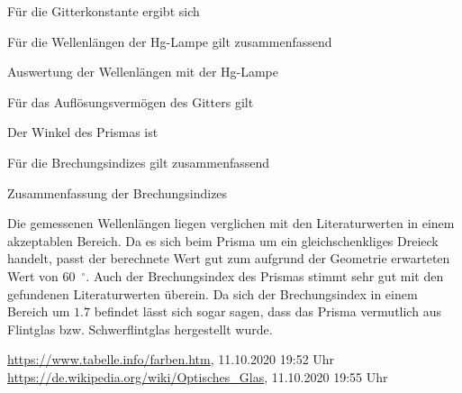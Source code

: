 \documentclass{article}
\begin{document}
Für die Gitterkonstante ergibt sich


Für die Wellenlängen der Hg-Lampe gilt zusammenfassend
\begin{table}[H]
\caption{Auswertung der Wellenlängen mit der Hg-Lampe}
\centering

\end{table}

Für das Auflösungsvermögen des Gitters gilt


Der Winkel des Prismas ist



Für die Brechungsindizes gilt zusammenfassend
\begin{table}[H]
\caption{Zusammenfassung der Brechungsindizes}
\centering

\end{table}




Die gemessenen Wellenlängen liegen verglichen mit den Literaturwerten \cite{other} in einem akzeptablen Bereich.
Da es sich beim Prisma um ein gleichschenkliges Dreieck handelt, passt der berechnete Wert gut zum aufgrund der Geometrie erwarteten Wert von 60~${}^\circ$.
Auch der Brechungsindex des Prismas stimmt sehr gut mit den gefundenen Literaturwerten \cite{wiki} überein. Da sich der Brechungsindex in einem Bereich um $1.7$ befindet lässt sich sogar sagen, dass das Prisma vermutlich aus Flintglas bzw. Schwerflintglas hergestellt wurde.




\begin{thebibliography}{9}
 \url{https://www.tabelle.info/farben.htm}, 11.10.2020 19:52 Uhr
 \url{https://de.wikipedia.org/wiki/Optisches_Glas}, 11.10.2020 19:55 Uhr
\end{thebibliography}






%

%


%
\end{document}
